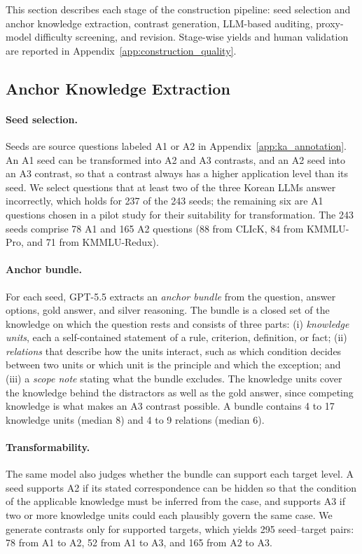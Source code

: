 This section describes each stage of the construction pipeline: seed selection and anchor knowledge extraction, contrast generation, LLM-based auditing, proxy-model difficulty screening, and revision.
Stage-wise yields and human validation are reported in Appendix~\ref{app:construction_quality}.

\subsection{Anchor Knowledge Extraction}

\paragraph{Seed selection.}
Seeds are source questions labeled A1 or A2 in Appendix~\ref{app:ka_annotation}.
An A1 seed can be transformed into A2 and A3 contrasts, and an A2 seed into an A3 contrast, so that a contrast always has a higher application level than its seed.
We select questions that at least two of the three Korean LLMs answer incorrectly, which holds for 237 of the 243 seeds; the remaining six are A1 questions chosen in a pilot study for their suitability for transformation.
The 243 seeds comprise 78 A1 and 165 A2 questions (88 from CLIcK, 84 from KMMLU-Pro, and 71 from KMMLU-Redux).

\paragraph{Anchor bundle.}
For each seed, GPT-5.5 extracts an \textit{anchor bundle} from the question, answer options, gold answer, and silver reasoning.
The bundle is a closed set of the knowledge on which the question rests and consists of three parts: (i) \textit{knowledge units}, each a self-contained statement of a rule, criterion, definition, or fact; (ii) \textit{relations} that describe how the units interact, such as which condition decides between two units or which unit is the principle and which the exception; and (iii) a \textit{scope note} stating what the bundle excludes.
The knowledge units cover the knowledge behind the distractors as well as the gold answer, since competing knowledge is what makes an A3 contrast possible.
A bundle contains 4 to 17 knowledge units (median 8) and 4 to 9 relations (median 6).

\paragraph{Transformability.}
The same model also judges whether the bundle can support each target level.
A seed supports A2 if its stated correspondence can be hidden so that the condition of the applicable knowledge must be inferred from the case, and supports A3 if two or more knowledge units could each plausibly govern the same case.
We generate contrasts only for supported targets, which yields 295 seed--target pairs: 78 from A1 to A2, 52 from A1 to A3, and 165 from A2 to A3.

